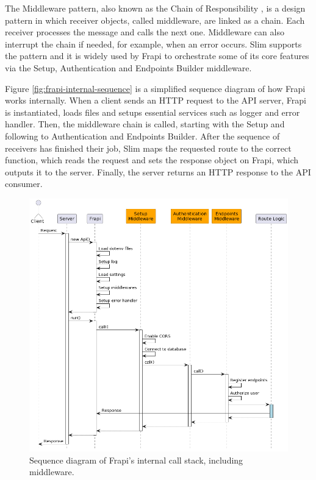 The Middleware pattern, also known as the Chain of Responsibility \cite{chain-of-responsibility}, is a design pattern in which receiver objects, called middleware, are linked as a chain. Each receiver processes the message and calls the next one. Middleware can also interrupt the chain if needed, for example, when an error occurs. Slim supports the pattern \cite{slim-middleware-doc} and it is widely used by Frapi to orchestrate some of its core features via the Setup, Authentication and Endpoints Builder middleware.

Figure \autoref{fig:frapi-internal-sequence} is a simplified sequence diagram of how Frapi works internally. When a client sends an HTTP request to the API server, Frapi is instantiated, loads files and setups essential services such as logger and error handler. Then, the middleware chain is called, starting with the Setup and following to Authentication and Endpoints Builder. After the sequence of receivers has finished their job, Slim maps the requested route to the correct function, which reads the request and sets the response object on Frapi, which outputs it to the server. Finally, the server returns an HTTP response to the API consumer.

\begin{figure}[htbp]
  \centering
  \includegraphics[scale=0.5]{Imagens/chap03/middleware-sequence-diagram.png}
  \caption{Sequence diagram of Frapi's internal call stack, including middleware.}
  \label{fig:frapi-internal-sequence}
\end{figure}